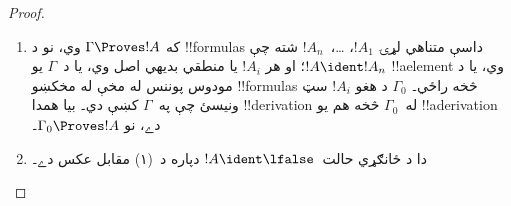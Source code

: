 \documentclass[../../../include/open-logic-section]{subfiles}
\begin{document}
\begin{proof}
  \begin{enumerate}
    \item که $\Gamma \Proves !A$ وي، نو د !!{formula}s داسې متناهي
      لړۍ $!A_1$، \dots،~$!A_n$ شته چې $!A \ident !A_n$؛ او هر
      $!A_i$ يا منطقي بديهي اصل وي، يا د~$\Gamma$ يو !!a{element}
      وي، يا د مودوس پوننس له مخې له مخکښو !!{formula}s څخه راځي۔
      $\Gamma_0$ د هغو $!A_i$ سټ ونيسئ چې په~$\Gamma$ کښې دي۔ بيا
      همدا !!{derivation} له~$\Gamma_0$ څخه هم يو !!a{derivation}
      دے، نو $\Gamma_0 \Proves !A$۔
    \item دا د ځانګړي حالت~$!A \ident \lfalse$ دپاره د~(۱) مقابل
      عکس دے۔
\end{enumerate}
\end{proof}
\end{document}
